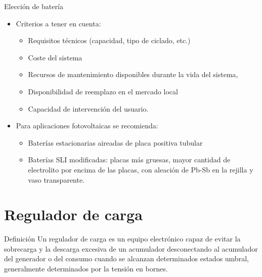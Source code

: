 \documentclass[xcolor={usenames,svgnames,dvipsnames}]{beamer}
\begin{document}
\begin{frame}[label={sec:org28ab366}]{Elección de batería}
\begin{itemize}
\item Criterios a tener en cuenta:

\begin{itemize}
\item \alert{Requisitos técnicos} (capacidad, tipo de ciclado, etc.)

\item \alert{Coste del sistema}

\item Recursos de \alert{mantenimiento} disponibles durante la vida del sistema,

\item \alert{Disponibilidad de reemplazo} en el mercado local

\item Capacidad de intervención del usuario.
\end{itemize}

\item \alert{Para aplicaciones fotovoltaicas} se recomienda:

\begin{itemize}
\item \alert{Baterías estacionarias aireadas de placa positiva tubular}

\item \alert{Baterías SLI modificadas}: placas más gruesas, mayor cantidad de
electrolito por encima de las placas, con aleación de Pb-Sb en la
rejilla y vaso transparente.
\end{itemize}
\end{itemize}
\end{frame}

\section{Regulador de carga}
\label{sec:orgba11ea8}

\begin{frame}[label={sec:org0793d7b}]{Definición}
Un regulador de carga es un equipo electrónico capaz de \alert{evitar la sobrecarga y la descarga excesiva de un acumulador} desconectando al acumulador del generador o del consumo \alert{cuando se alcanzan determinados estados umbral, generalmente determinados por la tensión en bornes}.
\end{frame}
\end{document}
